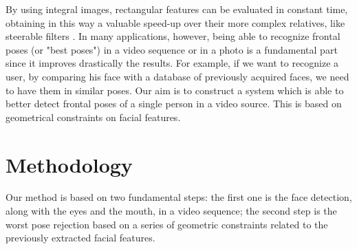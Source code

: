 \documentclass[10pt,a4paper]{report}
\begin{document}
By using integral images, rectangular features can be evaluated in constant time, obtaining in this way a valuable speed-up over their more complex relatives, like steerable filters \cite{steerable}.
In many applications, however, being able to recognize frontal poses (or "best poses") in a video sequence or in a photo is a fundamental part since it improves drastically the results. For example, if we want to recognize a user, by comparing his face with a database of previously acquired faces, we need to have them in similar poses.
Our aim is to construct a system which is able to better detect frontal poses of a single person in a video source. This is based on geometrical constraints on facial features.

\section*{Methodology}
Our method is based on two fundamental steps: the first one is the face detection, along with the eyes and the mouth, in a video sequence; the second step is the worst pose rejection based on a series of geometric constraints related to the previously extracted facial features.
\end{document}
